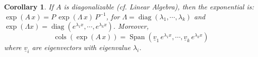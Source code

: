 \documentclass[12pt]{article}
\DeclareMathOperator{\C}{\mathbb{C}}
\newcommand{\tuple}[1]{\underline{#1}}
\newtheorem{definition}[theorem]{Definition}
\newtheorem{corollary}[theorem]{Corollary}
\begin{document}
\begin{corollary}
  If $A$ is diagonalizable (cf. Linear Algebra), then the exponential is: $\exp(A\,x)=P\,\exp(\Lambda\, x)\,P^{-1}$, for $\Lambda=\operatorname{diag}(\lambda_1,\cdots,\lambda_k)$ and $\exp(\Lambda x)=\operatorname{diag}(e^{\lambda_1 x},\cdots,e^{\lambda_k x})$. Moreover, $$\operatorname{cols}(\exp(A\,x))=\operatorname{Span}(\tuple{v}_1\,e^{\lambda_1 x},\cdots,\tuple{v}_k\,e^{\lambda_k x})$$ where $\tuple{v}_i$ are eigenvectors with eigenvalue $\lambda_i$.
\end{corollary}

\end{document}

